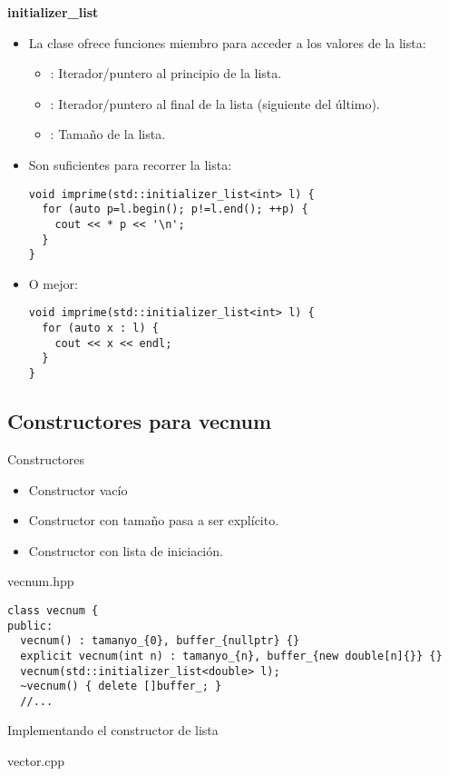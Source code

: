 \begin{frame}[fragile]{\textbf{initializer\_list}}
\begin{itemize}
  \item La clase  ofrece funciones miembro 
        para acceder a los valores de la lista:
    \begin{itemize}
      \item {}: Iterador/puntero al principio de la lista.
      \item {}: Iterador/puntero al final de la lista (siguiente del último).
      \item {}: Tamaño de la lista.
    \end{itemize}

  \item Son suficientes para recorrer la lista:
\begin{lstlisting}
void imprime(std::initializer_list<int> l) {
  for (auto p=l.begin(); p!=l.end(); ++p) {
    cout << * p << '\n';
  }
}
\end{lstlisting}

  \item O mejor:
\begin{lstlisting}
void imprime(std::initializer_list<int> l) {
  for (auto x : l) {
    cout << x << endl;
  }
}
\end{lstlisting}
\end{itemize}
\end{frame}

\subsection{Constructores para \textbf{vecnum}}

\begin{frame}[t,fragile]{Constructores}
\begin{itemize}
  \item Constructor vacío
  \item Constructor con tamaño pasa a ser explícito.
  \item Constructor con lista de iniciación.
\end{itemize}
\begin{block}{vecnum.hpp}
\begin{lstlisting}
class vecnum {
public:
  vecnum() : tamanyo_{0}, buffer_{nullptr} {}
  explicit vecnum(int n) : tamanyo_{n}, buffer_{new double[n]{}} {}
  vecnum(std::initializer_list<double> l);
  ~vecnum() { delete []buffer_; }
  //...
\end{lstlisting}
\end{block}
\end{frame}

\begin{frame}[t,fragile]{Implementando el constructor de lista}
\begin{block}{vector.cpp}

\end{block}
\end{frame}
